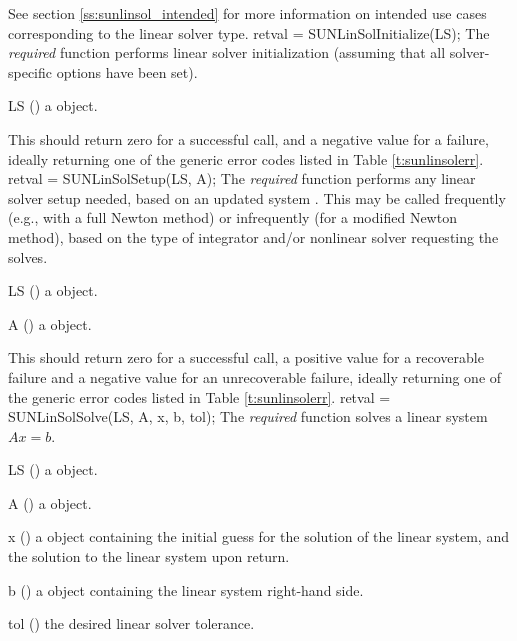 {
 See section \ref{ss:sunlinsol_intended} for more information on intended use
 cases corresponding to the linear solver type.
}
{
  retval = SUNLinSolInitialize(LS);
}
{
  The \textit{required} function  performs
  linear solver initialization (assuming that all solver-specific
  options have been set).
}
{
  \begin{args}[LS]
  \item[LS] ()
    a {\sunlinsol} object.
  \end{args}
}
{
  This should return zero for a
  successful call, and a negative value for a failure, ideally
  returning one of the generic error codes listed in Table
  \ref{t:sunlinsolerr}.
}
{}
{
  retval = SUNLinSolSetup(LS, A);
}
{
  The \textit{required} function  performs
  any linear solver setup needed, based on an updated system
  {\sunmatrix} .  This may be called frequently (e.g., with a full
  Newton method) or infrequently (for a modified Newton method), based
  on the type of integrator and/or nonlinear solver requesting the
  solves.
}
{
  \begin{args}[LS]
  \item[LS] ()
    a {\sunlinsol} object.
  \item[A] ()
    a {\sunmatrix} object.
  \end{args}
}
{
  This should return zero for a successful call, a positive
  value for a recoverable failure and a negative value for an
  unrecoverable failure, ideally returning one of the generic error
  codes listed in Table \ref{t:sunlinsolerr}.
}
{}
{
  retval = SUNLinSolSolve(LS, A, x, b, tol);
}
{
  The \textit{required} function  solves a linear system $Ax = b$.
}
{
  \begin{args}[tol]
  \item[LS] ()
    a {\sunlinsol} object.
  \item[A] ()
    a {\sunmatrix} object.
  \item[x] ()
    a {\nvector} object containing the initial guess for the solution of the
    linear system, and the solution to the linear system upon return.
  \item[b] ()
    a {\nvector} object containing the linear system right-hand side.
  \item[tol] ()
    the desired linear solver tolerance.
  \end{args}
}
